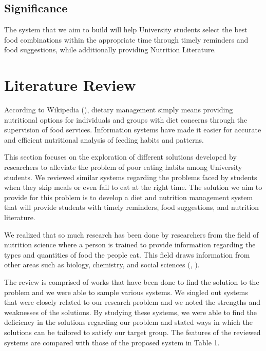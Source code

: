 \documentclass{article}
\begin{document}
\subsection{Significance}

The system that we aim to build will help University students select the best food combinations within the appropriate time through timely reminders and food suggestions, while additionally providing Nutrition Literature.


\newpage
\section{Literature Review}

According to Wikipedia (\citeyear{wikipedia2019dietary}), dietary management simply means providing nutritional options for individuals and groups with diet concerns through the supervision of food services. Information systems have made it easier for accurate and efficient nutritional analysis of feeding habits and patterns.

This section focuses on the exploration of different solutions developed by researchers to alleviate the problem of poor eating habits among University students. We reviewed similar systems regarding the problems faced by students when they skip meals or even fail to eat at the right time. The solution we aim to provide for this problem is to develop a diet and nutrition management system that will provide students with timely reminders, food suggestions, and nutrition literature.

We realized that so much research has been done by researchers from the field of nutrition science where a person is trained to provide information regarding the types and quantities of food the people eat. This field draws information from other areas such as biology, chemistry, and social sciences (\citeauthor{sriram2020hire}, \citeyear{sriram2020hire}).

The review is comprised of works that have been done to find the solution to the problem and we were able to sample various systems. We singled out systems that were closely related to our research problem and we noted the strengths and weaknesses of the solutions. By studying these systems, we were able to find the deficiency in the solutions regarding our problem and stated ways in which the solutions can be tailored to satisfy our target group. The features of the reviewed systems are compared with those of the proposed system in Table 1.
\end{document}
